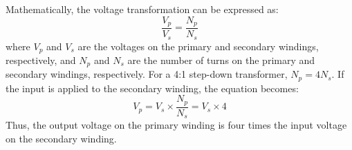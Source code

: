 Mathematically, the voltage transformation can be expressed as:
\[
\frac{V_p}{V_s} = \frac{N_p}{N_s}
\]
where \( V_p \) and \( V_s \) are the voltages on the primary and secondary windings, respectively, and \( N_p \) and \( N_s \) are the number of turns on the primary and secondary windings, respectively. For a 4:1 step-down transformer, \( N_p = 4N_s \). If the input is applied to the secondary winding, the equation becomes:
\[
V_p = V_s \times \frac{N_p}{N_s} = V_s \times 4
\]
Thus, the output voltage on the primary winding is four times the input voltage on the secondary winding.

